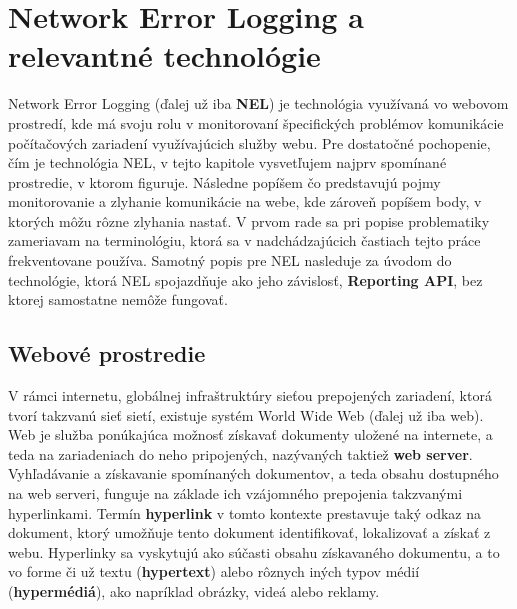 \chapter{Network Error Logging a relevantné technológie}
\label{nel-and-related-technologies}             


Network Error Logging (ďalej už iba \textbf{NEL}) je technológia využívaná vo webovom prostredí, 
kde má svoju rolu v monitorovaní špecifických problémov komunikácie počítačových zariadení využívajúcich služby webu.
Pre dostatočné pochopenie, čím je technológia NEL, v tejto kapitole vysvetľujem najprv 
spomínané prostredie, v ktorom figuruje. 
Následne popíšem čo predstavujú pojmy monitorovanie a zlyhanie komunikácie na webe, kde zároveň popíšem body, v ktorých môžu rôzne zlyhania nastať. 
V prvom rade sa pri popise problematiky zameriavam na terminológiu, ktorá sa v nadchádzajúcich častiach tejto práce frekventovane používa. 
Samotný popis pre NEL nasleduje za úvodom do technológie, ktorá NEL spojazdňuje ako jeho závislosť, \textbf{Reporting API}, bez ktorej samostatne nemôže fungovať. %


\section{Webové prostredie}
\label{webove-prostredie}

V rámci internetu, globálnej infraštruktúry sieťou prepojených zariadení, ktorá tvorí takzvanú sieť sietí, existuje systém World Wide Web (ďalej už iba web).
Web je služba ponúkajúca možnosť získavať dokumenty uložené na internete, a teda na zariadeniach do neho pripojených, nazývaných taktiež \textbf{web server}. 
Vyhľadávanie a získavanie spomínaných dokumentov, a teda obsahu dostupného na web serveri, funguje na základe ich vzájomného prepojenia takzvanými hyperlinkami.
Termín \textbf{hyperlink} v tomto kontexte prestavuje taký odkaz na dokument, ktorý umožňuje tento dokument identifikovať, lokalizovať a získať z webu. 
Hyperlinky sa vyskytujú ako súčasti obsahu získavaného dokumentu, a to vo forme či už textu (\textbf{hypertext}) alebo rôznych iných typov médií (\textbf{hypermédiá}), ako napríklad obrázky, videá alebo reklamy. 


